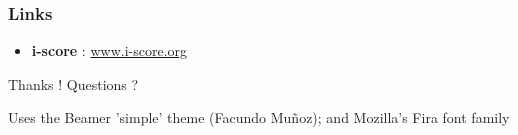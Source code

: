 \documentclass{beamer}
\begin{document}
\begin{frame}[allowframebreaks]%
    
    
    
    {\footnotesize
        \nocite{*}
        
        
    }
\end{frame}

\begin{frame}
    \frametitle{Links} 
    \Large
    \begin{itemize}
        \setlength\itemsep{1em}
        \item \textbf{i-score} : \url{www.i-score.org}
    \end{itemize}
        
    \centering
    \vspace{2em}
    \Large{Thanks ! Questions ?}
    \vspace{2em}
    
    \tiny{Uses the Beamer 'simple' theme (Facundo Muñoz); and Mozilla's Fira font family}
\end{frame}
\end{document}
